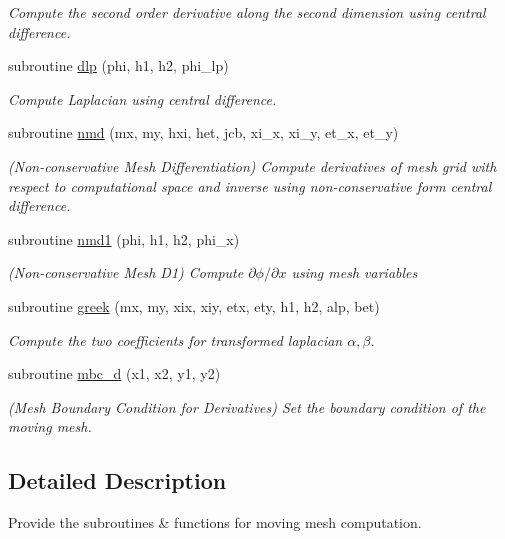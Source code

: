 \begin{DoxyCompactItemize}
\begin{DoxyCompactList}\small\item\em Compute the second order derivative along the second dimension using central difference. \end{DoxyCompactList}\item 
subroutine \hyperlink{namespacemirana_a353bce8a93046cd8fd25021634d6503e}{dlp} (phi, h1, h2, phi\+\_\+lp)
\begin{DoxyCompactList}\small\item\em Compute Laplacian using central difference. \end{DoxyCompactList}\item 
subroutine \hyperlink{namespacemirana_a53c223d4530275ef3fc6a5820f5b0990}{nmd} (mx, my, hxi, het, jcb, xi\+\_\+x, xi\+\_\+y, et\+\_\+x, et\+\_\+y)
\begin{DoxyCompactList}\small\item\em (Non-\/conservative Mesh Differentiation) Compute derivatives of mesh grid with respect to computational space and inverse using non-\/conservative form central difference. \end{DoxyCompactList}\item 
subroutine \hyperlink{namespacemirana_a71faa480fd08e57cac1a862ab527971b}{nmd1} (phi, h1, h2, phi\+\_\+x)
\begin{DoxyCompactList}\small\item\em (Non-\/conservative Mesh D1) Compute $\partial\phi/\partial x$ using mesh variables \end{DoxyCompactList}\item 
subroutine \hyperlink{namespacemirana_a7530ea2e7b2dfe85f3a088d24de59f1d}{greek} (mx, my, xix, xiy, etx, ety, h1, h2, alp, bet)
\begin{DoxyCompactList}\small\item\em Compute the two coefficients for transformed laplacian $\alpha,\beta$. \end{DoxyCompactList}\item 
subroutine \hyperlink{namespacemirana_a65a514d206d0e8ae53253938d2aff553}{mbc\+\_\+d} (x1, x2, y1, y2)
\begin{DoxyCompactList}\small\item\em (Mesh Boundary Condition for Derivatives) Set the boundary condition of the moving mesh. \end{DoxyCompactList}\end{DoxyCompactItemize}


\subsection{Detailed Description}
Provide the subroutines \& functions for moving mesh computation. 

